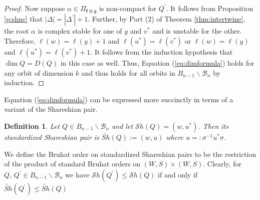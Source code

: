 \documentclass[12pt]{amsart}
\numberwithin{equation}{section}
\newtheorem{dfn}[thm]{Definition}
\newcommand{\fk}{\mbox{${\mathfrak k}$}}
\newcommand{\fg}{\mbox{${\mathfrak g}$}}
\newcommand{\B}{\mathcal{B}}
\newcommand{\he}{\hat{e}}
\newcommand{\Borbitspace}{B_{n-1}\backslash\B_{n}}
\newcommand{\Sh}{\mathcal{S}h}
\begin{document}
\begin{proof}
 
Now suppose $\alpha\in\Pi_{\fk\oplus \fg}$ is non-compact   for $Q^{\prime}$.  It follows from Proposition \ref{p:shnc} that $|\Delta|=|\Delta^{\prime}|+1$.  Further, by Part (2) of Theorem \ref{thm:intertwine}, the root $\alpha$ is complex stable for one of $y$ and $v^{*}$ and is unstable for the other.  Therefore, $\ell(w)=\ell(y)+1$ and $\ell(u^{*})=\ell(v^{*})$ or $\ell(w)=\ell(y)$ and $\ell(u^{*})=\ell(v^{*})+1$.  It follows from the induction hypothesis that $\dim Q = D(Q)$ in this case as well.  Thus, Equation (\ref{eq:dimformula}) holds for any orbit of dimension $k$ and thus holds for all orbits in $\Borbitspace$ by induction. 


 






\end{proof}



Equation (\ref{eq:dimformula}) can be expressed more succinctly in terms of a variant of the Shareshian pair.  
\begin{dfn}\label{d:twistedSh}
Let $Q\in\Borbitspace$ and let $\Sh(Q)=(w,u^{*})$.  Then its {\it standardized Shareshian pair} is $\widetilde{Sh}(Q):=(w,u)$ where $u=:\sigma^{-1} u^{*}\sigma$. 
\end{dfn}
We define the Bruhat order on standardized Shareshian pairs to be the restriction of the product of standard Bruhat orders on $(W,S)\times (W,S)$.  
Clearly, for $Q,\, Q^{\prime}\in\Borbitspace$ we have $\Sh(Q^{\prime})\leq \Sh(Q)$ if and only if $\widetilde{Sh}(Q^{\prime})\leq \widetilde{Sh}(Q)$ 
\end{document}
